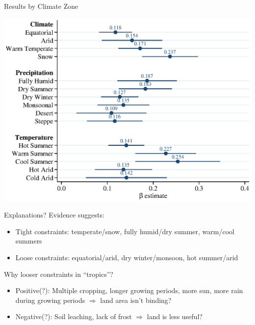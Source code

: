 \documentclass[10pt, xcolor=dvipsnames]{beamer}
\begin{document}
\begin{frame}{Results by Climate Zone}\label{climate}
\begin{center}
\includegraphics[width=.8\textwidth]{fig_coef_kg.eps}
\end{center}
\hfill \hyperlink{climatereg}{}
\end{frame}

\begin{frame}{Explanations?}
Evidence suggests:
\begin{itemize}
  \item Tight constraints: temperate/snow, fully humid/dry summer, warm/cool summers
  \item Loose constraints: equatorial/arid, dry winter/monsoon, hot summer/arid
\end{itemize}

\vspace{.2cm} Why looser constraints in ``tropics''?
\begin{itemize}
  \item Positive(?): Multiple cropping, longer growing periods, more sun, more rain during growing periods $\Rightarrow$ land area isn't binding?
  \item Negative(?): Soil leaching, lack of frost $\Rightarrow$ land is less useful?
\end{itemize}
\end{frame}
\end{document}
